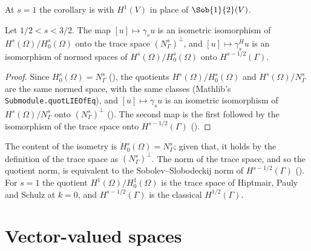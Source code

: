 At $s = 1$ the corollary is  with $H^1(V)$ in place of
$\Sob{1}{2}(V)$.

\begin{corollary}
\label{cor:sobolev-trace-kernel-quotient}
\leanok
{}
Let $1/2 < s < 3/2$. The map $[u] \mapsto \gamma_s u$ is an isometric isomorphism of
$H^s(\Omega) / H^s_0(\Omega)$ onto the trace space $(N^s_\Gamma)^\perp$, and
$[u] \mapsto \gamma^H_s u$ is an isomorphism of normed spaces of $H^s(\Omega) / H^s_0(\Omega)$
onto $H^{s-1/2}(\Gamma)$.
\end{corollary}

\begin{proof}
\leanok
Since $H^s_0(\Omega) = N^s_\Gamma$ (), the quotients
$H^s(\Omega) / H^s_0(\Omega)$ and $H^s(\Omega) / N^s_\Gamma$ are the same normed space, with the
same classes (Mathlib's \texttt{Submodule.\allowbreak quotLIEOfEq}), and $[u] \mapsto \gamma_s u$
is an isometric isomorphism of $H^s(\Omega) / N^s_\Gamma$ onto $(N^s_\Gamma)^\perp$
(). The second map is the first followed by the isomorphism of the
trace space onto $H^{s-1/2}(\Gamma)$ ().
\end{proof}

The content of the isometry is $H^s_0(\Omega) = N^s_\Gamma$; given that, it holds by the
definition of the trace space as $(N^s_\Gamma)^\perp$. The norm of the trace space, and so the
quotient norm, is equivalent to the Sobolev--Slobodeckij norm of $H^{s-1/2}(\Gamma)$
(). For $s = 1$ the quotient $H^1(\Omega) / H^1_0(\Omega)$ is
the trace space of Hiptmair, Pauly and Schulz \cite{HiptmairPaulySchulz} at $k = 0$, and
$H^{s-1/2}(\Gamma)$ is the classical $H^{1/2}(\Gamma)$.

\section{Vector-valued spaces}
\label{sec:vector-sobolev}

